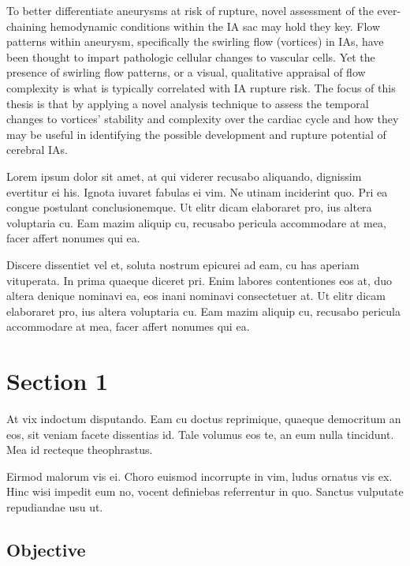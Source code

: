 To better differentiate aneurysms at risk of rupture, novel assessment of the ever-chaining hemodynamic conditions within the IA sac may hold they key. Flow patterns within aneurysm, specifically the swirling flow (vortices) in IAs, have been thought to impart pathologic cellular changes to vascular cells. Yet the presence of swirling flow patterns, or a visual, qualitative appraisal of flow complexity is what is typically correlated with IA rupture risk. The focus of this thesis is that by applying a novel analysis technique to assess the temporal changes to vortices' stability and complexity over the cardiac cycle and how they may be useful in identifying the possible development and rupture potential of cerebral IAs. 



Lorem ipsum dolor sit amet, at qui viderer recusabo aliquando, dignissim 
evertitur ei his. Ignota iuvaret fabulas ei vim. Ne utinam inciderint quo. 
Pri ea congue postulant conclusionemque. Ut elitr dicam elaboraret pro, ius 
altera voluptaria cu. Eam mazim aliquip cu, recusabo pericula accommodare at 
mea, facer affert nonumes qui ea.

Discere dissentiet vel et, soluta nostrum epicurei ad eam, cu has aperiam 
vituperata. In prima quaeque diceret pri. Enim labores contentiones eos at, 
duo altera denique nominavi ea, eos inani nominavi consectetuer at. Ut elitr 
dicam elaboraret pro, ius altera voluptaria cu. Eam mazim aliquip cu, 
recusabo pericula accommodare at mea, facer affert nonumes qui ea.
\cite{Crystal09_01,DMOL3_01,HPL_DGEMM_02}

\section{Section 1}\label{CHAPTER1_SECTION1}

At vix indoctum disputando. Eam cu doctus reprimique, quaeque democritum 
an eos, sit veniam facete dissentias id. Tale volumus eos te, an eum nulla 
tincidunt. Mea id recteque theophrastus.

Eirmod malorum vis ei. Choro euismod incorrupte in vim, ludus ornatus vis ex. 
Hinc wisi impedit eum no, vocent definiebas referrentur in quo. Sanctus 
vulputate repudiandae usu ut.

\subsection{Objective}\label{CHAPTER1_SECTION1_SUBSECTION1}

